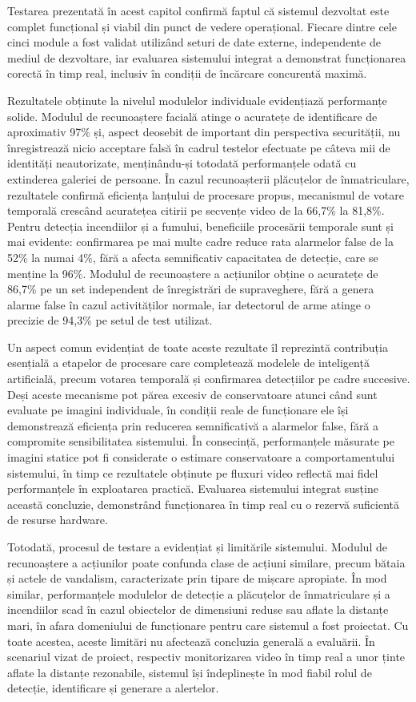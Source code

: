 \documentclass[../../main.tex]{subfiles}
\begin{document}
Testarea prezentată în acest capitol confirmă faptul că sistemul dezvoltat este complet funcțional și viabil din punct de vedere operațional. Fiecare dintre cele cinci module a fost validat utilizând seturi de date externe, independente de mediul de dezvoltare, iar evaluarea sistemului integrat a demonstrat funcționarea corectă în timp real, inclusiv în condiții de încărcare concurentă maximă.

Rezultatele obținute la nivelul modulelor individuale evidențiază performanțe solide. Modulul de recunoaștere facială atinge o acuratețe de identificare de aproximativ 97\% și, aspect deosebit de important din perspectiva securității, nu înregistrează nicio acceptare falsă în cadrul testelor efectuate pe câteva mii de identități neautorizate, menținându-și totodată performanțele odată cu extinderea galeriei de persoane. În cazul recunoașterii plăcuțelor de înmatriculare, rezultatele confirmă eficiența lanțului de procesare propus, mecanismul de votare temporală crescând acuratețea citirii pe secvențe video de la 66,7\% la 81,8\%. Pentru detecția incendiilor și a fumului, beneficiile procesării temporale sunt și mai evidente: confirmarea pe mai multe cadre reduce rata alarmelor false de la 52\% la numai 4\%, fără a afecta semnificativ capacitatea de detecție, care se menține la 96\%. Modulul de recunoaștere a acțiunilor obține o acuratețe de 86,7\% pe un set independent de înregistrări de supraveghere, fără a genera alarme false în cazul activităților normale, iar detectorul de arme atinge o precizie de 94,3\% pe setul de test utilizat.

Un aspect comun evidențiat de toate aceste rezultate îl reprezintă contribuția esențială a etapelor de procesare care completează modelele de inteligență artificială, precum votarea temporală și confirmarea detecțiilor pe cadre succesive. Deși aceste mecanisme pot părea excesiv de conservatoare atunci când sunt evaluate pe imagini individuale, în condiții reale de funcționare ele își demonstrează eficiența prin reducerea semnificativă a alarmelor false, fără a compromite sensibilitatea sistemului. În consecință, performanțele măsurate pe imagini statice pot fi considerate o estimare conservatoare a comportamentului sistemului, în timp ce rezultatele obținute pe fluxuri video reflectă mai fidel performanțele în exploatarea practică. Evaluarea sistemului integrat susține această concluzie, demonstrând funcționarea în timp real cu o rezervă suficientă de resurse hardware.

Totodată, procesul de testare a evidențiat și limitările sistemului. Modulul de recunoaștere a acțiunilor poate confunda clase de acțiuni similare, precum bătaia și actele de vandalism, caracterizate prin tipare de mișcare apropiate. În mod similar, performanțele modulelor de detecție a plăcuțelor de înmatriculare și a incendiilor scad în cazul obiectelor de dimensiuni reduse sau aflate la distanțe mari, în afara domeniului de funcționare pentru care sistemul a fost proiectat. Cu toate acestea, aceste limitări nu afectează concluzia generală a evaluării. În scenariul vizat de proiect, respectiv monitorizarea video în timp real a unor ținte aflate la distanțe rezonabile, sistemul își îndeplinește în mod fiabil rolul de detecție, identificare și generare a alertelor.
\end{document}
